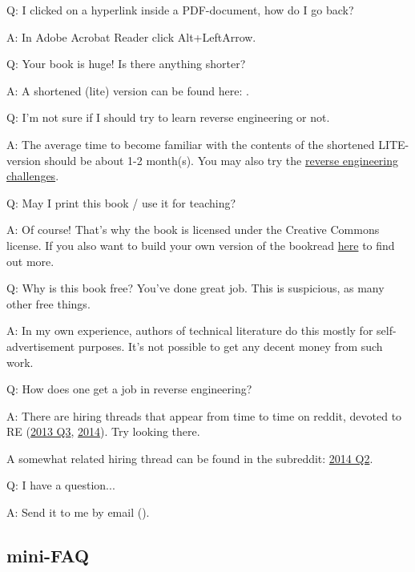 \par Q: I clicked on a hyperlink inside a PDF-document, how do I go back?
\par A: In Adobe Acrobat Reader click Alt+LeftArrow.

\ifx\LITE\undefined
\par Q: Your book is huge! Is there anything shorter?
\par A: A shortened (lite) version can be found here: \LITEURL{}.
\fi

\par Q: I'm not sure if I should try to learn reverse engineering or not.
\par A: The average time to become familiar with the contents of the shortened LITE-version should be about 1-2 month(s).
You may also try the \href{http://challenges.re/}{reverse engineering challenges}.

\par Q: May I print this book / use it for teaching?
\par A: Of course! That's why the book is licensed under the Creative Commons license.
If you also want to build your own version of the book\textemdash{}read \href{\HACKINGMdURL}{here} to find out more.

\par Q: Why is this book free? You've done great job. This is suspicious, as many other free things.
\par A: In my own experience, authors of technical literature do this mostly for self-advertisement purposes. It's not possible to get any decent money from such work.

\par Q: How does one get a job in reverse engineering?
\par A: There are hiring threads that appear from time to time on reddit, devoted to RE\FNURLREDDIT{}
(\href{http://go.yurichev.com/17333}{2013 Q3}, 
\href{http://go.yurichev.com/17334}{2014}).
Try looking there.

A somewhat related hiring thread can be found in the  subreddit:
\href{http://go.yurichev.com/17335}{2014 Q2}.

\par Q: I have a question...
\par A: Send it to me by email (\EMAIL).

\fi %

\ifdefined\SPANISH
\subsection*{mini-FAQ}

